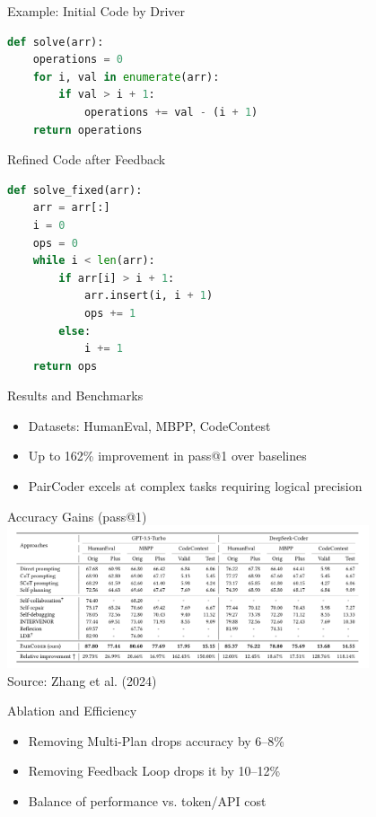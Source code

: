 \documentclass{beamer}
\begin{document}
\begin{frame}[fragile]{Example: Initial Code by Driver}
\begin{lstlisting}[language=Python,caption=Driver's original code output]
def solve(arr):
    operations = 0
    for i, val in enumerate(arr):
        if val > i + 1:
            operations += val - (i + 1)
    return operations
\end{lstlisting}
\end{frame}

\begin{frame}[fragile]{Refined Code after Feedback}
\begin{lstlisting}[language=Python,caption=Code after Navigator refinement]
def solve_fixed(arr):
    arr = arr[:]
    i = 0
    ops = 0
    while i < len(arr):
        if arr[i] > i + 1:
            arr.insert(i, i + 1)
            ops += 1
        else:
            i += 1
    return ops
\end{lstlisting}
\end{frame}

\begin{frame}{Results and Benchmarks}
\begin{itemize}
  \item Datasets: HumanEval, MBPP, CodeContest
  \item Up to 162\% improvement in pass@1 over baselines
  \item PairCoder excels at complex tasks requiring logical precision
\end{itemize}
\end{frame}

\begin{frame}{Accuracy Gains (pass@1)}
\centering
\includegraphics[width=0.8\textwidth]{paircoder-results.png} \\[0.5em]
\small Source: Zhang et al. (2024)
\end{frame}

\begin{frame}{Ablation and Efficiency}
\begin{itemize}
  \item Removing Multi-Plan drops accuracy by 6--8\%
  \item Removing Feedback Loop drops it by 10--12\%
  \item Balance of performance vs. token/API cost
\end{itemize}
\end{frame}
\end{document}
